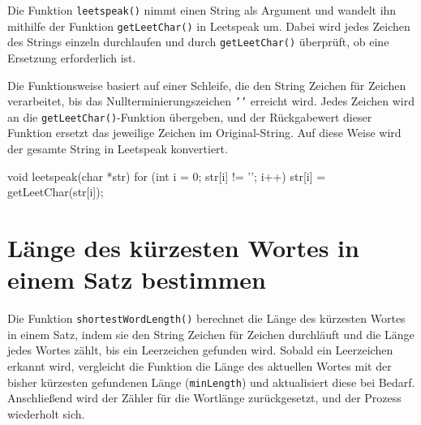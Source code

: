 
Die Funktion \texttt{leetspeak()} nimmt einen String als Argument und
wandelt ihn mithilfe der Funktion \texttt{getLeetChar()} in Leetspeak um.
Dabei wird jedes Zeichen des Strings einzeln durchlaufen und durch
\texttt{getLeetChar()} überprüft, ob eine Ersetzung erforderlich ist.

Die Funktionsweise basiert auf einer Schleife, die den String Zeichen für
Zeichen verarbeitet, bis das Nullterminierungszeichen \texttt{'\0'}
erreicht wird. Jedes Zeichen wird an die \texttt{getLeetChar()}-Funktion
übergeben, und der Rückgabewert dieser Funktion ersetzt das jeweilige Zeichen im
Original-String. Auf diese Weise wird der gesamte String in Leetspeak
konvertiert.

\begin{codebox}[lang=c, fontsize=\small]
void leetspeak(char *str) {
    for (int i = 0; str[i] != '\0'; i++) {
        str[i] = getLeetChar(str[i]);
    }
}
\end{codebox}



\chapter{Länge des kürzesten Wortes in einem Satz bestimmen}

Die Funktion \texttt{shortestWordLength()} berechnet die Länge des
kürzesten Wortes in einem Satz, indem sie den String Zeichen für Zeichen
durchläuft und die Länge jedes Wortes zählt, bis ein Leerzeichen gefunden wird.
Sobald ein Leerzeichen erkannt wird, vergleicht die Funktion die Länge des
aktuellen Wortes mit der bisher kürzesten gefundenen Länge
(\texttt{minLength}) und aktualisiert diese bei Bedarf. Anschließend wird
der Zähler für die Wortlänge zurückgesetzt, und der Prozess wiederholt sich.

